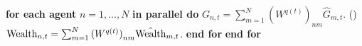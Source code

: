 \begin{algorithmic}[1]
    \STATE{} \hspace{\algorithmicindent} \textbf{for each agent} $n=1, \dots, N$ \textbf{in parallel do}
    \STATE{} \hspace{\algorithmicindent}\hspace{\algorithmicindent} $G_{n,t} = \sum_{m=1}^N {(W^{q(t)})}_{nm} \hat{G}_{m,t}$.
    \STATE{} \hspace{\algorithmicindent}\hspace{\algorithmicindent} \colorbox{red!30}{() $\text{Wealth}_{n,t} = \sum_{m=1}^N {(W^{q(t)})}_{nm} \hat{\text{Wealth}}_{m,t}$.}
    \STATE{} \hspace{\algorithmicindent} \textbf{end for}
    \STATE{} \textbf{end for}
\end{algorithmic}
